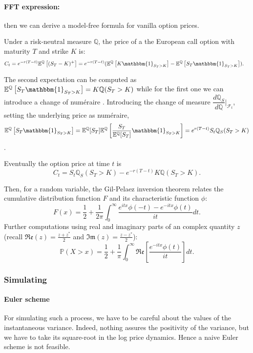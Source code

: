 \paragraph{FFT expression:} then we can derive a model-free formula for vanilla option prices.

Under a risk-neutral measure $\mathbb{Q}$, the price of a the European call option with maturity $T$ and strike $K$ is:
\begin{align*}
    C_t = e^{-r(T-t)} \mathbb{E}^{\mathbb{Q}}\left[(S_T - K)^{+}\right]
    &= e^{-r(T-t)} (\mathbb{E}^{\mathbb{Q}}\left[K \mathbbm{1}_{S_T > K}\right] - \mathbb{E}^{\mathbb{Q}}\left[S_T \mathbbm{1}_{S_T > K}\right]).
\end{align*}

The second expectation can be computed as $\mathbb{E}^{\mathbb{Q}}\left[S_T \mathbbm{1}_{S_T > K}\right] = K\mathbb{Q}(S_T>K)$ while for the first one we can introduce a change of num\'eraire \cite{el1995changes}. Introducing the change of measure $\dfrac{d\mathbb{Q}_S}{d\mathbb{Q}} \Big|_{\mathcal{F}_t}$, setting the underlying price as num\'eraire, \[\mathbb{E}^{\mathbb{Q}}\left[S_T \mathbbm{1}_{S_T > K}\right] = \mathbb{E}^{\mathbb{Q}}[S_T] \mathbb{E}^{\mathbb{Q}}\left[\dfrac{S_T}{\mathbb{E}^{\mathbb{Q}}[S_T]} \mathbbm{1}_{S_T > K}\right] = e^{r(T-t)}S_t \mathbb{Q}_S(S_T>K)\].

Eventually the option price at time $t$ is \[C_t = S_t \mathbb{Q}_S(S_T>K) - e^{-r(T-t)}K\mathbb{Q}(S_T>K).\]

Then, for a random variable, the Gil-Pelaez inversion theorem \cite{gil1951note} relates the cumulative distribution function $F$ and its characteristic function $\phi$: \[F(x) = \frac1{2} + \frac1{2\pi} \int_0^\infty \dfrac{e^{itx}\phi(-t) - e^{-itx}\phi(t)}{it} dt.\]
Further computations using real and imaginary parts of an complex quantity $z$ (recall $\mathfrak{Re}(z) = \frac{z + z^{*}}{2}$ and $\mathfrak{Im}(z) = \frac{z - z^{*}}{2}$):
\[\mathbb{P}(X > x) = \frac1{2} + \frac1{\pi} \int_0^\infty \mathfrak{Re}\left[ \dfrac{e^{-itx}\phi(t)}{it} \right] dt.\]

\subsubsection*{Simulating}

\paragraph{Euler scheme}
For simulating such a process, we have to be careful about the values of the instantaneous variance. Indeed, nothing assures the positivity of the variance, but we have to take its square-root in the log price dynamics. Hence a naive Euler scheme is not feasible.

